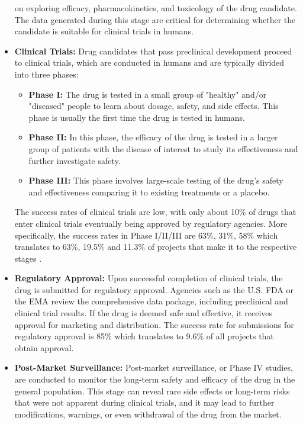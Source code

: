 \begin{itemize}
            on exploring efficacy, pharmacokinetics, and toxicology of the drug candidate. The data
            generated during this stage are critical for determining whether the candidate is
            suitable for clinical trials in humans.
      \item \textbf{Clinical Trials:} Drug candidates that pass preclinical development proceed to
            clinical trials, which are conducted in humans and are typically divided into three phases:
            \begin{itemize}
                  \item \textbf{Phase I:} The drug is tested in a small group of "healthy" and/or "diseased" people to learn about
                        dosage, safety, and side effects. This phase is usually the first time the drug is tested in humans.
                  \item \textbf{Phase II:} In this phase, the efficacy of the drug is tested in a larger
                        group of patients with the disease of interest to study its effectiveness and further investigate safety.
                  \item \textbf{Phase III:} This phase involves large-scale testing of the drug's safety
                        and effectiveness comparing it to existing treatments or a placebo.
            \end{itemize}
            The success rates of clinical trials are low, with only about 10\% of drugs that enter clinical
            trials eventually being approved by regulatory agencies. More specifically, the success rates in
            Phase I/II/III are 63\%, 31\%, 58\% which translates to 63\%, 19.5\% and 11.3\% of projects that
            make it to the respective stages \citep{mullardParsingClinicalSuccess2016}.
      \item \textbf{Regulatory Approval:} Upon successful completion of clinical trials, the drug is
            submitted for regulatory approval. Agencies such as the U.S. \Ac{FDA} or the \Ac{EMA}
            review the comprehensive data package, including preclinical and clinical trial results.
            If the drug is deemed safe and effective, it receives approval for marketing and
            distribution. The success rate for submissions for regulatory approval is 85\%
            \citep{mullardParsingClinicalSuccess2016} which translates to 9.6\% of all projects that
            obtain approval.
      \item \textbf{Post-Market Surveillance:} Post-market surveillance, or Phase IV studies, are
            conducted to monitor the long-term safety and efficacy of the drug in the general population.
            This stage can reveal rare side effects or long-term risks that were not apparent during
            clinical trials, and it may lead to further modifications, warnings, or even withdrawal of the
            drug from the market.
\end{itemize}

